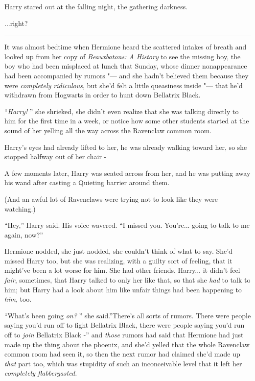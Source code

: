 Harry stared out at the falling night, the gathering darkness.

...right?

\begin{center}\rule{3in}{0.4pt}\end{center}

It was almost bedtime when Hermione heard the scattered intakes of
breath and looked up from her copy of \emph{Beauxbatons: A History} to
see the missing boy, the boy who had been misplaced at lunch that
Sunday, whose dinner nonappearance had been accompanied by rumors "--- and
she hadn't believed them because they were \emph{completely ridiculous},
but she'd felt a little queasiness inside "--- that he'd withdrawn from
Hogwarts in order to hunt down Bellatrix Black.

``\emph{Harry!} '' she shrieked, she didn't even realize that she was
talking directly to him for the first time in a week, or notice how some
other students started at the sound of her yelling all the way across
the Ravenclaw common room.

Harry's eyes had already lifted to her, he was already walking toward
her, so she stopped halfway out of her chair -

A few moments later, Harry was seated across from her, and he was
putting away his wand after casting a Quieting barrier around them.

(And an awful lot of Ravenclaws were trying not to look like they were
watching.)

``Hey,'' Harry said. His voice wavered. ``I missed you. You're...
going to talk to me again, now?''

Hermione nodded, she just nodded, she couldn't think of what to say.
She'd missed Harry too, but she was realizing, with a guilty sort of
feeling, that it might've been a lot worse for him. She had other
friends, Harry... it didn't feel \emph{fair}, sometimes, that Harry
talked to only her like that, so that she \emph{had} to talk to him; but
Harry had a look about him like unfair things had been happening to
\emph{him}, too.

``What's been going \emph{on?} '' she said.''There's all sorts of rumors.
There were people saying you'd run off to fight Bellatrix Black, there
were people saying you'd run off to \emph{join} Bellatrix Black -'' and
\emph{those} rumors had said that Hermione had just made up the thing
about the phoenix, and she'd yelled that the whole Ravenclaw common room
had seen it, so then the next rumor had claimed she'd made up
\emph{that} part too, which was stupidity of such an inconceivable level
that it left her \emph{completely flabbergasted.}

